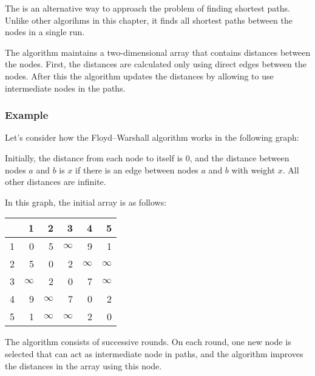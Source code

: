 
The 
is an alternative way to approach the problem
of finding shortest paths.
Unlike other algorihms in this chapter,
it finds all shortest paths between the nodes
in a single run.

The algorithm maintains a two-dimensional array
that contains distances between the nodes.
First, the distances are calculated only using
direct edges between the nodes.
After this the algorithm updates the distances
by allowing to use intermediate nodes in the paths.

\subsubsection{Example}

Let's consider how the Floyd–Warshall algorithm
works in the following graph:

\begin{center}
\end{center}

Initially, the distance from each node to itself is $0$,
and the distance between nodes $a$ and $b$ is $x$
if there is an edge between nodes $a$ and $b$ with weight $x$.
All other distances are infinite.

In this graph, the initial array is as follows:
\begin{center}
\begin{tabular}{r|rrrrr}
 & 1 & 2 & 3 & 4 & 5 \\
\hline
1 & 0 & 5 & $\infty$ & 9 & 1 \\
2 & 5 & 0 & 2 & $\infty$ & $\infty$ \\
3 & $\infty$ & 2 & 0 & 7 & $\infty$ \\
4 & 9 & $\infty$ & 7 & 0 & 2 \\
5 & 1 & $\infty$ & $\infty$ & 2 & 0 \\
\end{tabular}
\end{center}
\vspace{10pt}
The algorithm consists of successive rounds.
On each round, one new node is selected that
can act as intermediate node in paths,
and the algorithm improves the distances in the array
using this node.

